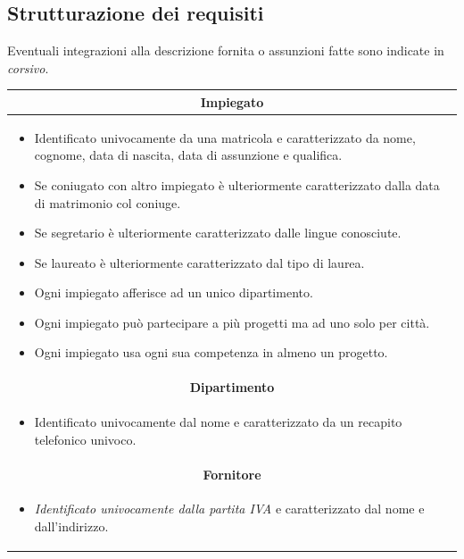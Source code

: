 \documentclass{article}
\begin{document}
\subsection{Strutturazione dei requisiti}
Eventuali integrazioni alla descrizione fornita o assunzioni fatte sono indicate in \textit{corsivo}.
\begin{table}[H]
\renewcommand{\arraystretch}{1.4}
\centering
\begin{tabular}{|p{}|}
\hline
\multicolumn{1}{|c|}{\textbf{Impiegato}}
\\ \hline
\begin{itemize}
\item Identificato univocamente da una matricola e caratterizzato da nome, cognome, data di nascita, data di assunzione e qualifica.
\newline
\item Se coniugato con altro impiegato è ulteriormente caratterizzato dalla data di matrimonio col coniuge.
\newline
\item Se segretario è ulteriormente caratterizzato dalle lingue conosciute.
\newline
\item Se laureato è ulteriormente caratterizzato dal tipo di laurea.
\newline
\item Ogni impiegato afferisce ad un unico dipartimento.
\newline
\item Ogni impiegato può partecipare a più progetti ma ad uno solo per città.
\newline
\item Ogni impiegato usa ogni sua competenza in almeno un progetto.
\end{itemize}
\\ \hline
\multicolumn{1}{|c|}{\textbf{Dipartimento}}
\\ \hline
\begin{itemize}
\item Identificato univocamente dal nome e caratterizzato da un recapito telefonico univoco.
\end{itemize}
\\ \hline
\multicolumn{1}{|c|}{\textbf{Fornitore}}
\\ \hline
\begin{itemize}
\item \textit{Identificato univocamente dalla partita IVA} e caratterizzato dal nome e dall'indirizzo.
\newline

\end{itemize}
\end{tabular}
\end{table}
\end{document}

